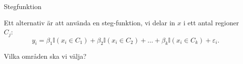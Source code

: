 \documentclass[10pt,english]{beamer}
\begin{document}




\begin{frame}{Stegfunktion}

    Ett alternativ är att använda en steg-funktion, vi delar in $x$ i ett antal regioner $C_j$:
    \begin{equation*}
        y_i = \beta_1 \mathbb{I}(x_i \in C_1) + \beta_2 \mathbb{I}(x_i \in C_2) + \ldots + \beta_k \mathbb{I}(x_i \in C_k) + \varepsilon_i.
    \end{equation*}
    
    Vilka områden ska vi välja?


\end{frame}
\end{document}

